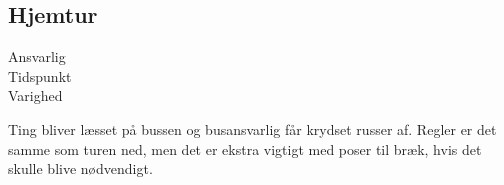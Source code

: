 \subsection{Hjemtur}

\begin{description}
\item[Ansvarlig] \placeholder
\item[Tidspunkt] \placeholder
\item[Varighed] \placeholder
\end{description}

Ting bliver læsset på bussen og busansvarlig får krydset russer af. Regler er det samme som turen ned, men det er ekstra vigtigt med poser til bræk, hvis det skulle blive nødvendigt.